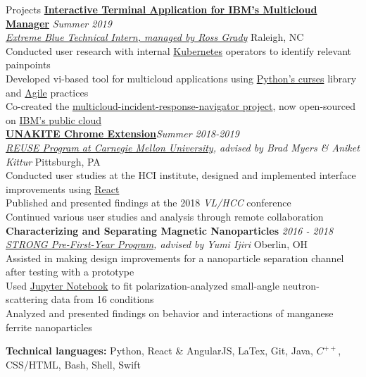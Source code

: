 \documentclass{resume}
\begin{document}
\begin{rSection}{Projects}
\href{https://github.com/IBM/multicloud-incident-response-navigator}{\bf Interactive Terminal Application for IBM's Multicloud Manager} \hfill  {\em Summer 2019} \\
\href{https://www.ibm.com/employment/extremeblue/index.html}{\em Extreme Blue Technical Intern, managed by Ross Grady} \hfill { Raleigh, NC} \\
{Conducted user research with internal \underline{Kubernetes} operators to identify relevant painpoints} \\
Developed vi-based tool for multicloud applications using \underline{Python's curses} library and \underline{Agile} practices \\
{Co-created the \href{https://github.com/IBM/multicloud-incident-response-navigator}{multicloud-incident-response-navigator project}, now open-sourced on \href{https://github.com/IBM/multicloud-incident-response-navigator}{IBM's public cloud}} \\
{\bf \href{https://unakite.info/}{UNAKITE Chrome Extension}}\hfill {\em Summer 2018-2019} \\
{\em \href{https://www.cmu.edu/scs/isr/reuse/}{REUSE Program at Carnegie Mellon University}, advised by Brad Myers \& Aniket Kittur} \hfill { Pittsburgh, PA}\\
Conducted user studies at the HCI institute, designed and implemented interface improvements using \underline{React} \\
Published and presented findings at the 2018 {\em VL/HCC} conference \\
Continued various user studies and analysis through remote collaboration\\
{\bf Characterizing and Separating Magnetic Nanoparticles } \hfill {\em 2016 - 2018}\\
{\em \href{https://www.oberlin.edu/undergraduate-research/programs/strong}{STRONG Pre-First-Year Program}, advised by Yumi Ijiri } \hfill { Oberlin, OH}\\
Assisted in making design improvements for a nanoparticle separation channel after testing with a prototype \\
Used \underline{Jupyter Notebook} to fit polarization-analyzed small-angle neutron-scattering data from 16 conditions \\
Analyzed and presented findings on behavior and interactions of manganese ferrite nanoparticles

 \textbf{Technical languages:} {Python, React \& AngularJS, LaTex, Git, Java, {$C^{++}$}, CSS/HTML, Bash, Shell, Swift}
\end{rSection}
\end{document}
